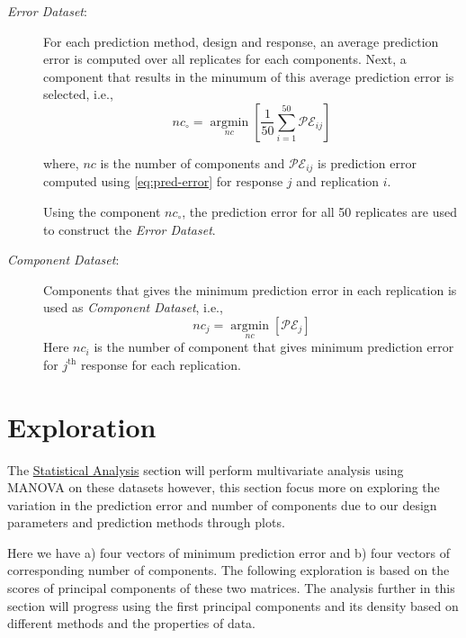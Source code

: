 \documentclass[12pt,3p,authoryear]{elsarticle}
\begin{document}
\begin{description}
\item[\emph{Error Dataset}:]
For each prediction method, design and response, an average prediction
error is computed over all replicates for each components. Next, a
component that results in the minumum of this average prediction error
is selected, i.e., \begin{equation}
  nc_\circ = \operatorname*{argmin}_{nc}\left[\frac{1}{50}\sum_{i=1}^{50}{\mathcal{PE}_{ij}}\right]
  \label{eq:min-pred}
  \end{equation}

where, \(nc\) is the number of components and \(\mathcal{PE}_{ij}\) is
prediction error computed using \eqref{eq:pred-error} for response \(j\)
and replication \(i\).

Using the component \(nc_\circ\), the prediction error for all 50
replicates are used to construct the \emph{Error Dataset}.
\item[\emph{Component Dataset}:]
Components that gives the minimum prediction error in each replication
is used as \emph{Component Dataset}, i.e., \begin{equation}
  nc_j = \operatorname*{argmin}_{nc}\left[\mathcal{PE}_{j}\right]
  \label{eq:min-comp}
  \end{equation} Here \(nc_i\) is the number of component that gives
minimum prediction error for \(j^\text{th}\) response for each
replication.
\end{description}

\hypertarget{exploration}{%
\section{Exploration}\label{exploration}}

The \protect\hyperlink{statistical-analysis}{Statistical Analysis}
section will perform multivariate analysis using MANOVA on these
datasets however, this section focus more on exploring the variation in
the prediction error and number of components due to our design
parameters and prediction methods through plots.

Here we have a) four vectors of minimum prediction error and b) four
vectors of corresponding number of components. The following exploration
is based on the scores of principal components of these two matrices.
The analysis further in this section will progress using the first
principal components and its density based on different methods and the
properties of data.
\end{document}
